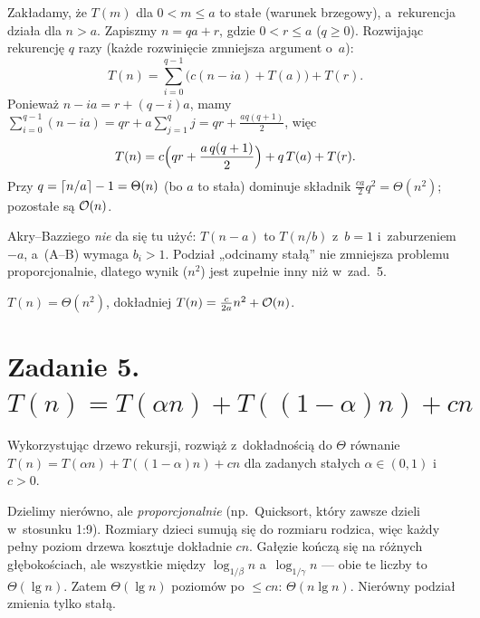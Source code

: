 \documentclass[11pt]{article}
\begin{document}
\begin{center}
\end{center}

\formalnie
Zakładamy, że $T(m)$ dla $0<m\le a$ to stałe (warunek brzegowy), a~rekurencja
działa dla $n>a$. Zapiszmy $n=qa+r$, gdzie $0<r\le a$ ($q\ge0$). Rozwijając
rekurencję $q$ razy (każde rozwinięcie zmniejsza argument o~$a$):
\[
T(n)=\sum_{i=0}^{q-1}\bigl(c(n-ia)+T(a)\bigr)+T(r).
\]
Ponieważ $n-ia=r+(q-i)a$, mamy $\sum_{i=0}^{q-1}(n-ia)=qr+a\sum_{j=1}^qj=qr+\frac{aq(q+1)}{2}$, więc
\[
T(n)=c\Bigl(qr+\frac{a\,q(q+1)}{2}\Bigr)+q\,T(a)+T(r).
\]
Przy $q=\left\lceil n/a \right\rceil-1=\Theta(n)$ (bo $a$ to stała) dominuje składnik
$\frac{ca}{2}q^2=\Theta(n^2)$; pozostałe są $\mathcal{O}(n)$.

\begin{uwaga}
Akry--Bazziego \emph{nie} da się tu użyć: $T(n-a)$ to $T(n/b)$ z~$b=1$
i~zaburzeniem $-a$, a~(A--B) wymaga $b_i>1$. Podział „odcinamy stałą” nie zmniejsza
problemu proporcjonalnie, dlatego wynik ($n^2$) jest zupełnie inny niż w~zad.~5.
\end{uwaga}
\begin{odpowiedz}$T(n)=\Theta(n^2)$, dokładniej $T(n)=\frac{c}{2a}n^2+\mathcal{O}(n)$.\end{odpowiedz}

\section{Zadanie 5. \texorpdfstring{$T(n)=T(\alpha n)+T((1-\alpha)n)+cn$}{T(n) = T(an) + T((1-a)n) + cn}}
\begin{tresc}
Wykorzystując drzewo rekursji, rozwiąż z~dokładnością do $\Theta$ równanie
$T(n)=T(\alpha n)+T((1-\alpha)n)+cn$ dla zadanych stałych $\alpha\in(0,1)$ i~$c>0$.
\end{tresc}

\begin{intuicja}
Dzielimy nierówno, ale \emph{proporcjonalnie} (np.\ Quicksort, który zawsze
dzieli w~stosunku 1:9). Rozmiary dzieci sumują się do rozmiaru rodzica, więc
każdy pełny poziom drzewa kosztuje dokładnie $cn$. Gałęzie kończą się na
różnych głębokościach, ale wszystkie między $\log_{1/\beta}n$
a~$\log_{1/\gamma}n$ --- obie te liczby to $\Theta(\lg n)$. Zatem
$\Theta(\lg n)$ poziomów po $\le cn$: $\Theta(n\lg n)$. Nierówny podział
zmienia tylko stałą.
\end{intuicja}
\end{document}
